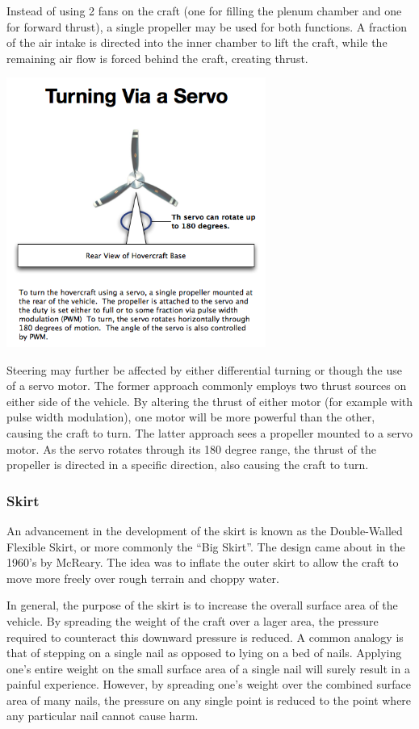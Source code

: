 Instead of using 2 fans on the craft (one for filling the plenum chamber and one for forward thrust), a single propeller may be used for both functions. A fraction of the air intake is directed into the inner chamber to lift the craft, while the remaining air flow is forced behind the craft, creating thrust.


  \begin{center}
    \includegraphics[width=85mm]{imageSources/servoTurning.png}
  \end{center}
  \label{servoTurning}


Steering may further be affected by either differential turning or though the use of a servo motor. The former approach commonly employs two thrust sources on either side of the vehicle. By altering the thrust of either motor (for example with pulse width modulation), one motor will be more powerful than the other, causing the craft to turn. The latter approach sees a propeller mounted to a servo motor. As the servo rotates through its 180 degree range, the thrust of the propeller is directed in a specific direction, also causing the craft to turn.

\subsubsection{Skirt}
An advancement in the development of the skirt is known as the Double-Walled Flexible Skirt, or more commonly the “Big Skirt”. The design came about in the 1960’s by McReary. The idea was to inflate the outer skirt to allow the craft to move more freely over rough terrain and choppy water.

In general, the purpose of the skirt is to increase the overall surface area of the vehicle. By spreading the weight of the craft over a lager area, the pressure required to counteract this downward pressure is reduced. A common analogy is that of stepping on a single nail as opposed to lying on a bed of nails. Applying one’s entire weight on the small surface area of a single nail will surely result in a painful experience. However, by spreading one’s weight over the combined surface area of many nails, the pressure on any single point is reduced to the point where any particular nail cannot cause harm.

